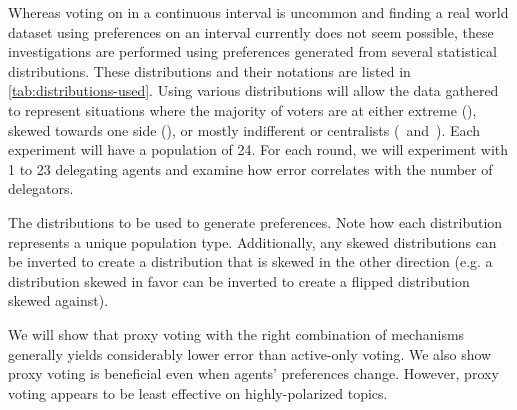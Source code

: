 Whereas voting on in a continuous interval is uncommon and finding a real world dataset
using preferences on an interval currently does not seem possible, these investigations
are performed using preferences generated from several statistical distributions.
These distributions and their notations are listed in \autoref{tab:distributions-used}.
Using various distributions will allow the data gathered to represent situations
where the majority of voters are at either extreme (),
skewed towards one side (), or mostly indifferent or centralists
(\gaussiandist~and~).
Each experiment will have a population of 24.
For each round, we will experiment with 1 to 23 delegating agents and examine how
error correlates with the number of delegators.

\begin{table}[!htbp]
    \renewcommand{\arraystretch}{1.3}

    \caption{
        The distributions to be used to generate preferences.
        Note how each distribution represents a unique population type.
        Additionally, any skewed distributions can be inverted to create a
        distribution that is skewed in the other direction (e.g. a distribution
        skewed in favor can be inverted to create a flipped distribution skewed
        against).
    }
    \label{tab:distributions-used}

    \centering
    
\end{table}

We will show that proxy voting with the right combination of mechanisms generally
yields considerably lower error than active-only voting.
We also show proxy voting is beneficial even when agents' preferences change.
However, proxy voting appears to be least effective on highly-polarized topics.
